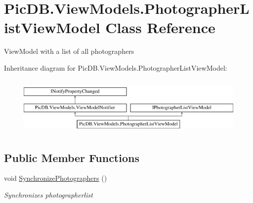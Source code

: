 \hypertarget{class_pic_d_b_1_1_view_models_1_1_photographer_list_view_model}{}\section{Pic\+D\+B.\+View\+Models.\+Photographer\+List\+View\+Model Class Reference}
\label{class_pic_d_b_1_1_view_models_1_1_photographer_list_view_model}


View\+Model with a list of all photographers  


Inheritance diagram for Pic\+D\+B.\+View\+Models.\+Photographer\+List\+View\+Model\+:\begin{figure}[H]
\begin{center}
\leavevmode
\includegraphics[height=2.886598cm]{class_pic_d_b_1_1_view_models_1_1_photographer_list_view_model}
\end{center}
\end{figure}
\subsection*{Public Member Functions}
\begin{DoxyCompactItemize}
\item 
void \mbox{\hyperlink{class_pic_d_b_1_1_view_models_1_1_photographer_list_view_model_aabaf179c4aa8ae8146a33eca6227c2f5}{Synchronize\+Photographers}} ()
\begin{DoxyCompactList}\small\item\em Synchronizes photographerlist \end{DoxyCompactList}\end{DoxyCompactItemize}
